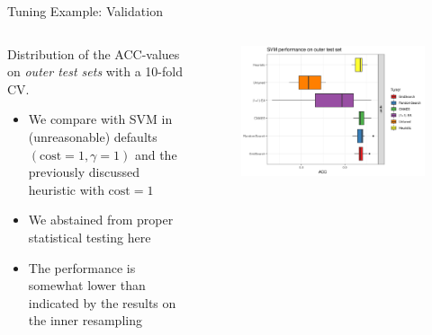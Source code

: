 \documentclass[11pt,compress,t,notes=noshow, xcolor=table]{beamer}
\begin{document}
\begin{frame}{Tuning Example: Validation}

\begin{columns}
\begin{column}{0.49\textwidth}

  Distribution of the ACC-values on \emph{outer test sets} with a 10-fold CV.


  \begin{itemize}
      \item We compare with SVM in (unreasonable) defaults $(\text{cost}=1,\gamma=1)$ and the previously discussed heuristic with $\text{cost} = 1$
    \item We abstained from proper statistical testing here
    \item The performance is somewhat lower than indicated by the results on the inner resampling
  \end{itemize}

\end{column}
\begin{column}{0.49\textwidth}
  \vspace{-1em}
  \begin{figure}
  \includegraphics[width=\textwidth]{figure/benchmark_boxplot_all.png}
  \end{figure}
\end{column}
\end{columns}
\end{frame}
\end{document}

